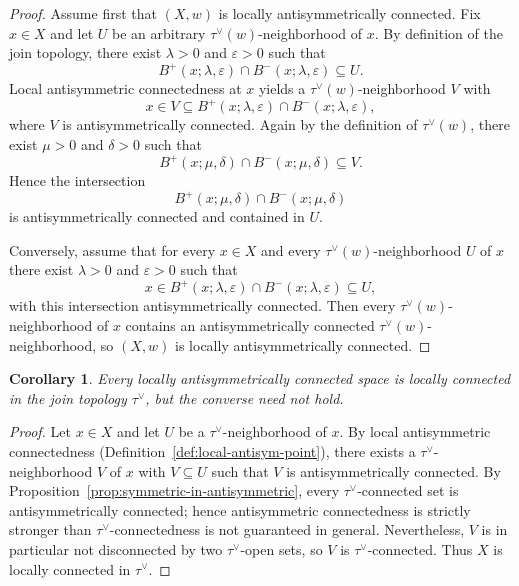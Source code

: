 \documentclass[preprint,12pt]{elsarticle}
\newtheorem{corollary}[theorem]{Corollary}
\begin{document}
\begin{proof}
Assume first that $(X,w)$ is locally antisymmetrically connected.
Fix $x\in X$ and let $U$ be an arbitrary $\tau^\vee(w)$-neighborhood of
$x$.
By definition of the join topology, there exist $\lambda>0$ and
$\varepsilon>0$ such that
\[
B^{+}(x;\lambda,\varepsilon)\cap B^{-}(x;\lambda,\varepsilon)\subseteq U.
\]
Local antisymmetric connectedness at $x$ yields a $\tau^\vee(w)$-neighborhood
$V$ with
\[
x\in V\subseteq B^{+}(x;\lambda,\varepsilon)\cap B^{-}(x;\lambda,\varepsilon),
\]
where $V$ is antisymmetrically connected.
Again by the definition of $\tau^\vee(w)$, there exist $\mu>0$ and
$\delta>0$ such that
\[
B^{+}(x;\mu,\delta)\cap B^{-}(x;\mu,\delta)\subseteq V.
\]
Hence the intersection
\[
B^{+}(x;\mu,\delta)\cap B^{-}(x;\mu,\delta)
\]
is antisymmetrically connected and contained in $U$.

Conversely, assume that for every $x\in X$ and every $\tau^\vee(w)$-neighborhood
$U$ of $x$ there exist $\lambda>0$ and $\varepsilon>0$ such that
\[
x\in B^{+}(x;\lambda,\varepsilon)\cap B^{-}(x;\lambda,\varepsilon)
\subseteq U,
\]
with this intersection antisymmetrically connected.
Then every $\tau^\vee(w)$-neighborhood of $x$ contains an
antisymmetrically connected $\tau^\vee(w)$-neighborhood, so $(X,w)$ is
locally antisymmetrically connected.
\end{proof}

\begin{corollary}
\label{cor:join-consequences}
Every locally antisymmetrically connected space is locally connected in
the join topology $\tau^\vee$, but the converse need not hold.
\end{corollary}

\begin{proof}
Let $x\in X$ and let $U$ be a $\tau^\vee$-neighborhood of $x$. By local
antisymmetric connectedness (Definition~\ref{def:local-antisym-point}),
there exists a $\tau^\vee$-neighborhood $V$ of $x$ with $V\subseteq U$ such
that $V$ is antisymmetrically connected. By
Proposition~\ref{prop:symmetric-in-antisymmetric}, every $\tau^\vee$-connected
set is antisymmetrically connected; hence antisymmetric connectedness is
strictly stronger than $\tau^\vee$-connectedness is not guaranteed in general.
Nevertheless, $V$ is in particular not disconnected by two $\tau^\vee$-open
sets, so $V$ is $\tau^\vee$-connected. Thus $X$ is locally connected in
$\tau^\vee$.
\end{proof}

\end{document}
